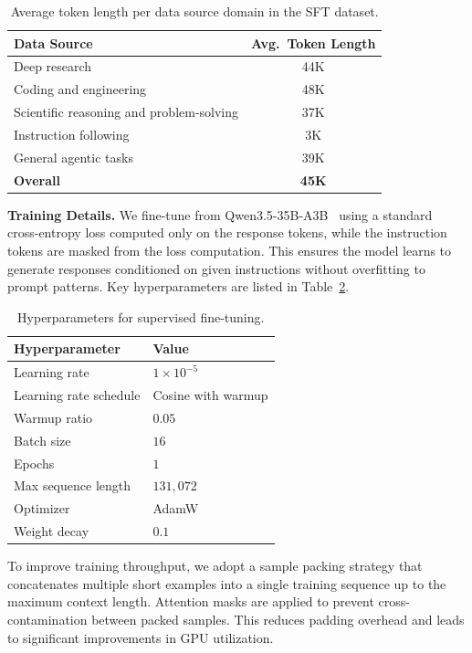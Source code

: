 \documentclass{llmxive}
\begin{document}
\begin{table}[ht]
\centering
\begin{tabular}{lc}
\toprule
\textbf{Data Source} & \textbf{Avg.\ Token Length} \\
\midrule
Deep research & 44K \\
Coding and engineering & 48K \\
Scientific reasoning and problem-solving & 37K \\
Instruction following & 3K \\
General agentic tasks & 39K \\
\midrule
\textbf{Overall} & \textbf{45K} \\
\bottomrule
\end{tabular}
\caption{Average token length per data source domain in the SFT dataset.}
\label{tab:sft_data_stats}
\end{table}

\textbf{Training Details.} We fine-tune from Qwen3.5-35B-A3B~\citep{Qwen3.5} using a standard cross-entropy loss computed only on the response tokens, while the instruction tokens are masked from the loss computation. This ensures the model learns to generate responses conditioned on given instructions without overfitting to prompt patterns. Key hyperparameters are listed in Table~\ref{tab:sft_hyperparams}.

\begin{table}[ht]
\centering
\begin{tabular}{ll}
\toprule
\textbf{Hyperparameter} & \textbf{Value} \\
\midrule
Learning rate & $1 \times 10^{-5}$ \\
Learning rate schedule & Cosine with warmup \\
Warmup ratio & $0.05$ \\
Batch size & $16$ \\
Epochs & $1$ \\
Max sequence length & $131{,}072$ \\
Optimizer & AdamW \\
Weight decay & $0.1$ \\
\bottomrule
\end{tabular}
\caption{Hyperparameters for supervised fine-tuning.}
\label{tab:sft_hyperparams}
\end{table}

To improve training throughput, we adopt a sample packing strategy that concatenates multiple short examples into a single training sequence up to the maximum context length. Attention masks are applied to prevent cross-contamination between packed samples. This reduces padding overhead and leads to significant improvements in GPU utilization. 
\end{document}
